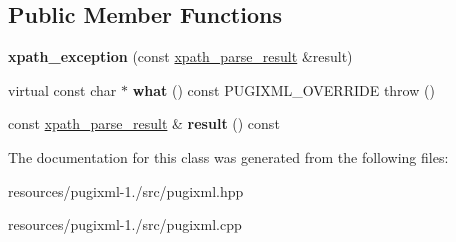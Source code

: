 \subsection*{Public Member Functions}
\begin{DoxyCompactItemize}
\item 
\hypertarget{classpugi_1_1xpath__exception_a67698821481b5a73213d21a1ac174410}{{\bfseries xpath\+\_\+exception} (const \hyperlink{structpugi_1_1xpath__parse__result}{xpath\+\_\+parse\+\_\+result} \&result)}\label{classpugi_1_1xpath__exception_a67698821481b5a73213d21a1ac174410}

\item 
\hypertarget{classpugi_1_1xpath__exception_a3451312335446d093e4e5382dc18bd27}{virtual const char $\ast$ {\bfseries what} () const P\+U\+G\+I\+X\+M\+L\+\_\+\+O\+V\+E\+R\+R\+I\+D\+E  throw ()}\label{classpugi_1_1xpath__exception_a3451312335446d093e4e5382dc18bd27}

\item 
\hypertarget{classpugi_1_1xpath__exception_a6602bbd541153f35a44c2233aa7d37de}{const \hyperlink{structpugi_1_1xpath__parse__result}{xpath\+\_\+parse\+\_\+result} \& {\bfseries result} () const }\label{classpugi_1_1xpath__exception_a6602bbd541153f35a44c2233aa7d37de}

\end{DoxyCompactItemize}


The documentation for this class was generated from the following files\+:\begin{DoxyCompactItemize}
\item 
resources/pugixml-\/1./src/pugixml.\+hpp\item 
resources/pugixml-\/1./src/pugixml.\+cpp\end{DoxyCompactItemize}
